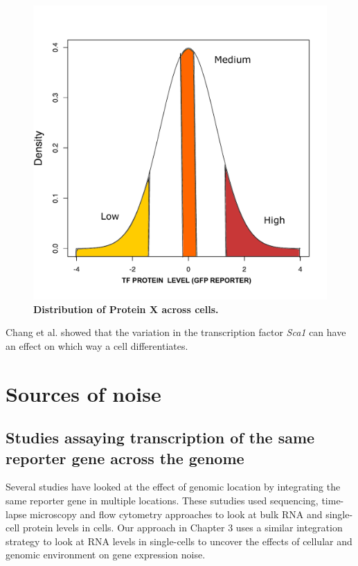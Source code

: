 \begin{figure}[t!]  
    \centering
    \includegraphics[width=\linewidth, scale=0.5]{figures/intro/intro_gfp_density_X.pdf}
    \caption[Distribution of Protein X across cells.]{%
        \textbf{Distribution of Protein X across cells.}
    }
    \label{fig:gfpXdensity}
\end{figure}


Chang et al. \cite {sui_huang} showed that the variation in the transcription factor \emph{Sca1}  can have an effect on which way a cell differentiates.


\section{Sources of noise}

\subsection{Studies assaying transcription of the same reporter gene across the genome}

Several studies have looked at the effect of genomic location by integrating the same reporter gene in multiple locations. These sutudies used sequencing, time-lapse microscopy and flow cytometry approaches to look at bulk RNA and single-cell protein levels in cells. Our approach in Chapter 3 uses a similar integration strategy to look at RNA levels in single-cells to uncover the effects of cellular and genomic environment on gene expression noise.

